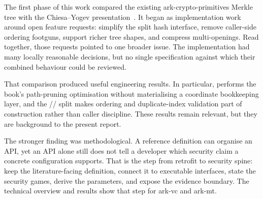 \label{sec:phase1}

The first phase of this work compared the existing
\textsf{ark-crypto-primitives} Merkle tree with the Chiesa--Yogev
presentation~\cite{CY26}.  It began as implementation work around open feature
requests: simplify the split hash interface, remove caller-side ordering
footguns, support richer tree shapes, and compress multi-openings.  Read
together, those requests pointed to one broader issue.  The implementation had
many locally reasonable decisions, but no single specification against which
their combined behaviour could be reviewed.

That comparison produced useful engineering results.  In particular,
 performs the book's path-pruning optimisation without
materialising a coordinate bookkeeping layer, and the
// split makes ordering and
duplicate-index validation part of construction rather than caller discipline.
These results remain relevant, but they are background to the present report.

The stronger finding was methodological.  A reference definition can organise
an API, yet an API alone still does not tell a developer which security claim a
concrete configuration supports.  That is the step from retrofit to security
spine: keep the literature-facing definition, connect it to executable
interfaces, state the security games, derive the parameters, and expose the
evidence boundary.  The technical overview and results show that step for
\textsf{ark-vc} and \textsf{ark-mt}.

